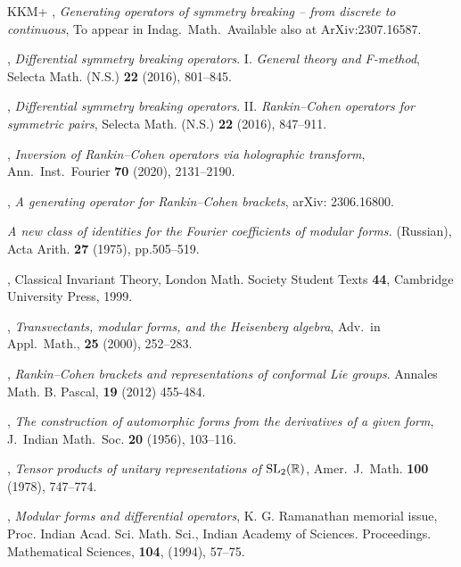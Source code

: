 \documentclass[12pt]{amsart}
\theoremstyle{plain} %
\theoremstyle{definition} %
\theoremstyle{remark} %
\begin{document}
\begin{thebibliography}{KKM+}
{}, 
{\it{Generating operators of symmetry breaking -- from
 discrete to continuous}},
To appear in Indag.\ Math.\
Available also at ArXiv:2307.16587.

{},
\textit{Differential symmetry breaking operators}. 
I. \textit{General theory and F-method}, 
Selecta Math.
 (N.S.) {\bf{22}} (2016), 
{801--845}.

{},
\textit{Differential symmetry breaking operators}. 
II. \textit{Rankin--Cohen operators for symmetric pairs}, 
Selecta Math.
 (N.S.) {\bf{22}} (2016), 
{847--911}.

{},
\textit{Inversion of Rankin--Cohen operators via holographic transform},  
Ann.\ Inst.\ Fourier %
{\bf{70}} (2020), 
{2131--2190}.

{},
\textit{A generating operator for Rankin--Cohen brackets}, 
arXiv: 2306.16800. 

{}
\textit{A new class of identities for the Fourier coefficients of modular forms.} (Russian), 
Acta Arith. \textbf{27} (1975), pp.505--519. 

{}, 
Classical Invariant Theory, London
Math. Society Student Texts \textbf{44}, Cambridge University
Press, 1999.

{},
{\it{Transvectants, modular forms, and the Heisenberg algebra}}, 
Adv.\ in Appl.\ Math., \textbf{25} (2000), 252--283.

{},
\textit{Rankin--Cohen brackets and representations of conformal Lie groups}. Annales Math. B. Pascal, {\bf{19}} (2012)
455-484.%

{}, 
{\it{The construction of automorphic forms from the derivatives
 of a given form}}, 
 J.\ Indian Math.\ Soc. {\bf{20}} (1956), 103--116.  

{}, 
\textit
{Tensor products of unitary representations of $\rm{SL}_2({\mathbb{R}})$}, 
Amer.\ J.\ Math. {\textbf{100}} (1978), 
747--774.


   {},
     \textit{Modular forms and differential operators},
      {K. G. Ramanathan memorial issue},
    {Proc. Indian Acad. Sci. Math. Sci.},
   {Indian Academy of Sciences. Proceedings. Mathematical
              Sciences},
    \textbf{104},
      {(1994)},
     57--75.


\end{thebibliography}
\end{document}

